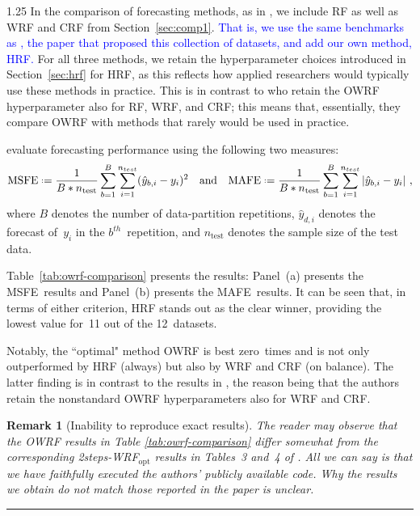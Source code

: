 \documentclass[12pt]{article}
\newcommand*{\defeq}{\mathrel{\vcenter{\baselineskip0.5ex\lineskiplimit0pt\hbox{\scriptsize.}\hbox{\scriptsize.}}}=}
\newtheorem{remark}{Remark}[section]
\numberwithin{equation}{section}
\theoremstyle{plain}
\def\qed{\rule{2mm}{2mm}}
\begin{document}
\begin{spacing}{1.25}
In the comparison of forecasting methods, as in \cite{chen:yu:zhang:2024}, we include RF as well as WRF and CRF from Section~\ref{sec:comp1}. \textcolor{blue}{That is, we use the same benchmarks as \cite{chen:yu:zhang:2024}, the paper that proposed this collection of datasets, and add our own method, HRF.} For all three methods, we retain the hyperparameter choices introduced in Section~\ref{sec:hrf} for HRF, as this reflects how applied researchers would typically use these methods in practice.
This is in contrast to \cite{chen:yu:zhang:2024} who retain the OWRF hyperparameter also for RF, WRF, and CRF; this means that, essentially, they compare OWRF with methods that rarely would be used in practice.

\cite{chen:yu:zhang:2024} evaluate forecasting performance using the following two measures:
$$
    \text{MSFE} \defeq \frac{1}{B*n_{\text{test}}} \sum_{b=1}^{B} \sum_{i=1}^{n_{test}} (\hat{y}_{b,i}-y_i)^2 \quad \mbox{and} \quad
    \text{MAFE} \defeq \frac{1}{B*n_{\text{test}}} \sum_{b=1}^{B} \sum_{i=1}^{n_{test}} |\hat{y}_{b,i}-y_i|~,
$$ 
where $B$ denotes the number of data-partition repetitions, 
$\hat{y}_{d,i}$ denotes the forecast  of~$y_i$ in the 
$b^{th}$~repetition, and $n_{\text{test}}$ denotes the sample size of the test data.

Table~\ref{tab:owrf-comparison} presents the results: 
Panel~(a) presents the MSFE~results and 
Panel~(b) presents the MAFE~results.
It can be seen that, in terms of either criterion, HRF stands out as the clear winner, providing the lowest value for~11 out of the 12~datasets. 

Notably, the ``optimal" method OWRF is best zero~times and is not only outperformed by HRF (always) but also by WRF and CRF (on balance).
The latter finding is in contrast to the results in \cite{chen:yu:zhang:2024}, the reason being that the authors retain the nonstandard OWRF hyperparameters also for WRF and CRF.



\begin{remark}[Inability to reproduce exact results]
\label{rem:dorks} \rm 
The reader may observe that the OWRF results in Table \ref{tab:owrf-comparison} differ somewhat from the corresponding 2steps-WRF\(_{\text{opt}}\) results in Tables~3 and~4 of \cite{chen:yu:zhang:2024}. All we can say is that we have faithfully executed the authors' publicly available code. Why the results we obtain do not match those reported in the paper is unclear.~\qed
\end{remark}  


\end{spacing}
\end{document}
